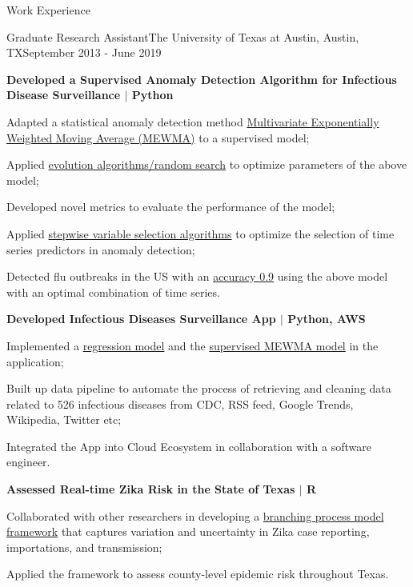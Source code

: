 \documentclass{my_resume} %
\begin{document}
\begin{rSection}{Work Experience}
  \begin{rSubsection}{Graduate Research Assistant}{The University of Texas at
    Austin, Austin, TX}{September 2013 - June 2019}
  \item[] \textbf{Developed a Supervised Anomaly Detection Algorithm for Infectious
    Disease Surveillance $|$ Python}
    \item Adapted a statistical anomaly detection method \underline{Multivariate
      Exponentially Weighted Moving Average (MEWMA)} to a supervised model;
    \item Applied \underline{evolution algorithms/random search} to optimize
      parameters of the above model;
    \item Developed novel metrics to evaluate the performance of the model;
    \item Applied \underline{stepwise variable selection algorithms} to
      optimize the selection of time series predictors in anomaly detection;
    \item Detected flu outbreaks in the US with an \underline{accuracy
      0.9} using the above model with an optimal combination of time series.
\vspace{1mm}
  \item[] \textbf{Developed Infectious Diseases Surveillance App $|$ Python, AWS}
    \item Implemented a \underline{regression model} and the
      \underline{supervised MEWMA model} in the application;
    \item Built up data pipeline to automate the process of retrieving and
      cleaning data related to 526 infectious diseases from CDC, RSS feed, Google
      Trends, Wikipedia, Twitter etc;
    \item Integrated the App into Cloud Ecosystem in collaboration with a
      software engineer.
\vspace{1mm}
  \item[] \textbf{Assessed Real-time Zika Risk in the State of Texas $|$ R}
  \item Collaborated with other researchers in developing a \underline{branching
      process model framework} that captures variation and uncertainty in Zika
      case reporting, importations, and transmission;
  \item Applied the framework to assess county-level epidemic risk throughout
    Texas.
  \end{rSubsection}
\end{rSection}
\end{document}
